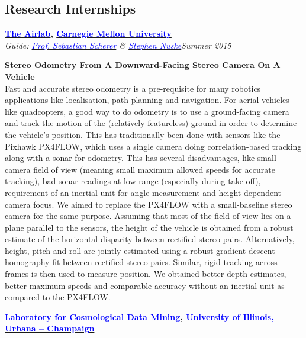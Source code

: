 \documentclass[margin,line]{res}
\newenvironment{list1}{
  \begin{list}{\ding{113}}{%
      \setlength{\itemsep}{0in}
      \setlength{\parsep}{0in} \setlength{\parskip}{0in}
      \setlength{\topsep}{0in} \setlength{\partopsep}{0in} 
      \setlength{\leftmargin}{0.17in}}}{\end{list}}
\begin{document}
\begin{resume}
\section{\sc Research Internships} 
{\bf  \href{http://theairlab.org/}{\textcolor{blue}{The Airlab}}, \href{http://www.cmu.edu/}{\textcolor{blue}{Carnegie Mellon University}}} \\
{\em Guide: \href{http://www.ri.cmu.edu/person.html?person_id=1397}{\textcolor{blue}{Prof. Sebastian Scherer}} \& \href{http://www.ri.cmu.edu/person.html?person_id=2128}{\textcolor{blue} {Stephen Nuske}}}\hfill\textit{Summer 2015}\\
\vspace*{-.13in}
\begin{list1}
\item[]\textbf{Stereo Odometry From A Downward-Facing Stereo Camera On A Vehicle} \\
Fast and accurate stereo odometry is a pre-requisite for many robotics applications like localisation, path planning and navigation. For aerial vehicles like quadcopters, a good way to do odometry is to use a ground-facing camera and track the motion of the (relatively featureless) ground in order to determine the vehicle's position. This has traditionally been done with sensors like the Pixhawk PX4FLOW, which uses a single camera doing correlation-based tracking along with a sonar for odometry. This has several disadvantages, like small camera field of view (meaning small maximum allowed speeds for accurate tracking), bad sonar readings at low range (especially during take-off), requirement of an inertial unit for angle measurement and height-dependent camera focus. We aimed to replace the PX4FLOW with a small-baseline stereo camera for the same purpose. Assuming that most of the field of view lies on a plane parallel to the sensors, the height of the vehicle is obtained from a robust estimate of the horizontal disparity between rectified stereo pairs. Alternatively, height, pitch and roll are jointly estimated using a robust gradient-descent homography fit between rectified stereo pairs. Similar, rigid tracking across frames is then used to measure position. We obtained better depth estimates, better maximum speeds and comparable accuracy without an inertial unit as compared to the PX4FLOW.
\end{list1}
{\bf \href{http://lcdm.astro.illinois.edu/}{\textcolor{blue} {Laboratory for Cosmological Data Mining}}, \href{http://www.illinois.edu/}{\textcolor{blue}{University of Illinois, Urbana -- Champaign}}} \\

\end{resume}
\end{document}
